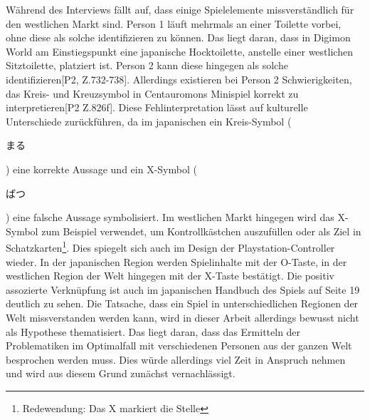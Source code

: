 Während des Interviews fällt auf, dass einige Spielelemente missverständlich für den westlichen Markt sind.
Person 1 läuft mehrmals an einer Toilette vorbei, ohne diese als solche identifizieren zu können.
Das liegt daran, dass  in Digimon World am Einstiegspunkt eine japanische Hocktoilette, anstelle einer westlichen Sitztoilette, platziert ist.
Person 2 kann diese hingegen als solche identifizieren[P2, Z.732-738].
Allerdings existieren bei Person 2 Schwierigkeiten, das Kreis- und Kreuzsymbol in Centauromons Minispiel korrekt zu interpretieren[P2 Z.826f].
Diese Fehlinterpretation lässt auf kulturelle Unterschiede zurückführen, da im japanischen ein Kreis-Symbol (\begin{CJK}{UTF8}{min}まる\end{CJK}) eine korrekte Aussage und ein X-Symbol (\begin{CJK}{UTF8}{min}ばつ\end{CJK}) eine falsche Aussage symbolisiert\cite{intermediate-japanese}.
Im westlichen Markt hingegen wird das X-Symbol zum Beispiel verwendet, um Kontrollkästchen auszufüllen oder als Ziel in Schatzkarten\footnote{Redewendung: \glqq Das X markiert die Stelle\grqq}.
Dies spiegelt sich auch im Design der Playstation-Controller wieder.
In der japanischen Region werden Spielinhalte mit der O-Taste, in der westlichen Region der Welt hingegen mit der X-Taste bestätigt\cite{controller-japanese}.
Die positiv assozierte Verknüpfung ist auch im japanischen Handbuch des Spiels auf Seite 19 deutlich zu sehen.
Die Tatsache, dass ein Spiel in unterschiedlichen Regionen der Welt missverstanden werden kann, wird in dieser Arbeit allerdings bewusst nicht als Hypothese thematisiert.
Das liegt daran, dass das Ermitteln der Problematiken im Optimalfall mit verschiedenen Personen aus der ganzen Welt besprochen werden muss.
Dies würde allerdings viel Zeit in Anspruch nehmen und wird aus diesem Grund zunächst vernachlässigt.\\

